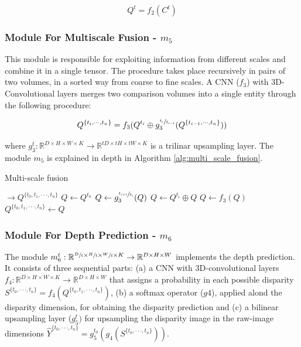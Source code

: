 \documentclass[runningheads]{llncs}
\begin{document}
\begin{equation}
    Q^t = f_2(C^t)
\end{equation}


\subsubsection{Module For Multiscale Fusion - $m_5$}

This module is responsible for exploiting information from different scales and combine it in a single tensor. The procedure takes place recursively in pairs of two volumes, in a sorted way from coarse to fine scales. A CNN ($f_3$) with 3D-Convolutional layers merges two comparison volumes into a single entity through the following procedure:

\begin{equation} \label{eq:two_scale_fusion}
Q^{ \{ t_i, \cdot \cdot \cdot, t_{n} \} } = f_3(Q^{t_i} \oplus g_3^{\sfrac{t_i}{t_{i-1}} }(Q^{ \{ t_{i-1}, \cdot \cdot \cdot, t_n \} }))
\end{equation}

where $g_3^t: \mathbb{R}^{D \times H \times W \times K} \rightarrow \mathbb{R}^{tD \times tH \times tW \times K}$ is a trilinar upsampling layer. The module $m_5$ is explained in depth in Algorithm \ref{alg:multi_scale_fusion}.


\begin{algorithm}
\caption{Multi-scale fusion}\label{alg:multi_scale_fusion}
\begin{algorithmic}[1]
 $\rightarrow Q^{\{t_0, t_1, \cdot \cdot \cdot, t_n\}}$ 
\State $Q \gets Q^{t_n}$ 
\State $Q \gets g_3^{\sfrac{ t_{i+1} }{ t_i } }(Q)$ 
\State $Q \gets Q^{t_i} \oplus Q$ 
\State $Q \gets f_3(Q)$ 
\EndFor
\State \Return $Q^{\{t_0, t_1, \cdot \cdot \cdot, t_n\}} \gets Q$ 
\EndProcedure
\end{algorithmic}
\end{algorithm}


\subsubsection{Module For Depth Prediction - $m_6$}

The module $m_6^t: \mathbb{R}^{\sfrac{D}{t} \times \sfrac{H}{t} \times \sfrac{W}{t} \times K} \rightarrow \mathbb{R}^{D \times H \times W}$ implements the depth prediction. It consists of three sequential parts: (a) a CNN with 3D-convolutional layers $f_4: \mathbb{R}^{D \times H \times W \times K} \rightarrow \mathbb{R}^{D \times H \times W}$ that assigns a probability in each possible disparity $S^{\{ t_0, \cdot \cdot \cdot, t_n \}} = f_4(Q^{\{t_0, t_1, \cdot \cdot \cdot, t_n\}})$, (b) a softmax operator ($g4$), applied alond the disparity dimension, for obtaining the disparity prediction and (c) a bilinear upsampling layer ($g_5^t)$ for upsampling the disparity image in the raw-image dimensions $\hat{Y}^{\{ t_0, \cdot \cdot \cdot, t_n \}} = g_5^{t_0}(g_4(S^{\{ t_0, \cdot \cdot \cdot, t_n \}}))$.
\end{document}
